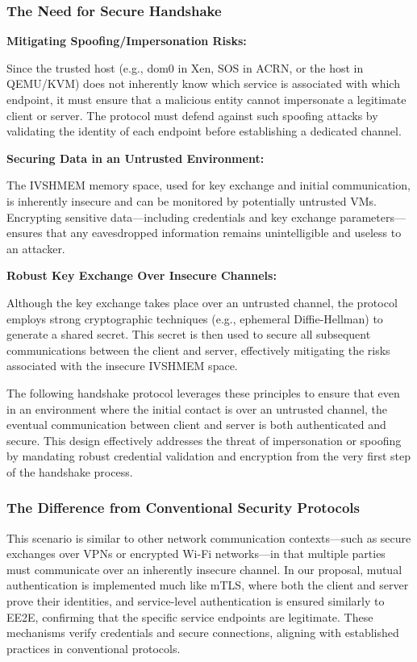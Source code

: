 \documentclass[letterpaper,twocolumn,10pt]{article}
\begin{document}
\subsubsection{The Need for Secure Handshake}


\textbf{Mitigating Spoofing/Impersonation Risks:}

Since the trusted host (e.g., dom0 in Xen, SOS in ACRN, or the host in QEMU/KVM) does not inherently know which service is associated with which endpoint, it must ensure that a malicious entity cannot impersonate a legitimate client or server. The protocol must defend against such spoofing attacks by validating the identity of each endpoint before establishing a dedicated channel.
    
\textbf{Securing Data in an Untrusted Environment:}

The IVSHMEM memory space, used for key exchange and initial communication, is inherently insecure and can be monitored by potentially untrusted VMs. Encrypting sensitive data—including credentials and key exchange parameters—ensures that any eavesdropped information remains unintelligible and useless to an attacker.
    
\textbf{Robust Key Exchange Over Insecure Channels:}

Although the key exchange takes place over an untrusted channel, the protocol employs strong cryptographic techniques (e.g., ephemeral Diffie-Hellman) to generate a shared secret. This secret is then used to secure all subsequent communications between the client and server, effectively mitigating the risks associated with the insecure IVSHMEM space.


The following handshake protocol leverages these principles to ensure that even in an environment where the initial contact is over an untrusted channel, the eventual communication between client and server is both authenticated and secure. This design effectively addresses the threat of impersonation or spoofing by mandating robust credential validation and encryption from the very first step of the handshake process.





\subsubsection{The Difference from Conventional Security Protocols}

This scenario is similar to other network communication contexts—such as secure exchanges over VPNs or encrypted Wi-Fi networks—in that multiple parties must communicate over an inherently insecure channel. In our proposal, mutual authentication is implemented much like mTLS, where both the client and server prove their identities, and service-level authentication is ensured similarly to EE2E, confirming that the specific service endpoints are legitimate. These mechanisms verify credentials and secure connections, aligning with established practices in conventional protocols.
\end{document}

